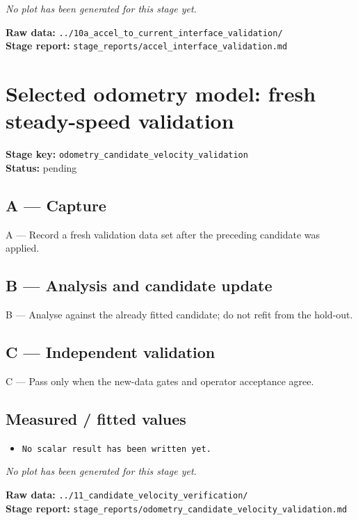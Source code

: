 \documentclass[11pt,a4paper]{article}
\begin{document}
\textit{No plot has been generated for this stage yet.}

\vfill
\textbf{Raw data:} \texttt{../10a\_accel\_to\_current\_interface\_validation/}\\
\textbf{Stage report:} \texttt{stage\_reports/accel\_interface\_validation.md}
\clearpage
\small
\section*{Selected odometry model: fresh steady-speed validation}
\textbf{Stage key:} \texttt{odometry\_candidate\_velocity\_validation}\\
\textbf{Status:} pending\\

\subsection*{A --- Capture}
A — Record a fresh validation data set after the preceding candidate was applied.

\subsection*{B --- Analysis and candidate update}
B — Analyse against the already fitted candidate; do not refit from the hold-out.

\subsection*{C --- Independent validation}
C — Pass only when the new-data gates and operator acceptance agree.

\subsection*{Measured / fitted values}
\begin{itemize}\setlength\itemsep{0pt}
\item \texttt{No scalar result has been written yet.}
\end{itemize}

\textit{No plot has been generated for this stage yet.}

\vfill
\textbf{Raw data:} \texttt{../11\_candidate\_velocity\_verification/}\\
\textbf{Stage report:} \texttt{stage\_reports/odometry\_candidate\_velocity\_validation.md}
\clearpage
\small
\end{document}
